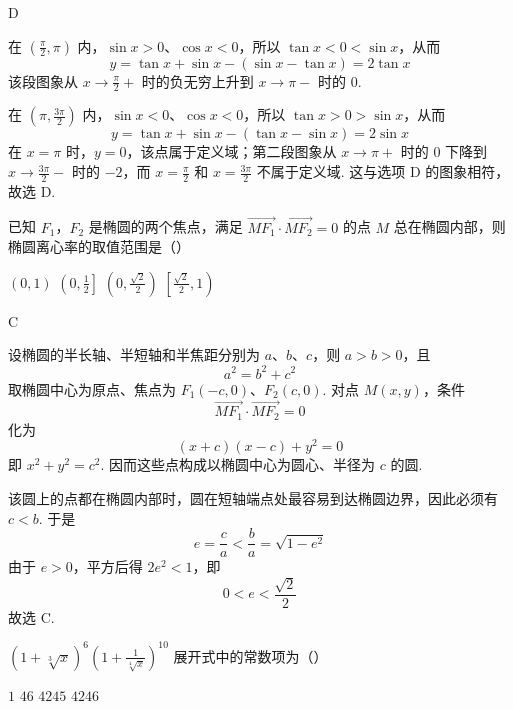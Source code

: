 \begin{answer}
D
\end{answer}

\begin{solution}
在 \(\left(\frac\pi2,\pi\right)\) 内，\(\sin x>0\)、\(\cos x<0\)，所以 \(\tan x<0<\sin x\)，从而
\[
y=\tan x+\sin x-(\sin x-\tan x)=2\tan x
\]
该段图象从 \(x\to\frac\pi2+\) 时的负无穷上升到 \(x\to\pi-\) 时的 \(0\).

在 \(\left(\pi,\frac{3\pi}{2}\right)\) 内，\(\sin x<0\)、\(\cos x<0\)，所以 \(\tan x>0>\sin x\)，从而
\[
y=\tan x+\sin x-(\tan x-\sin x)=2\sin x
\]
在 \(x=\pi\) 时，\(y=0\)，该点属于定义域；第二段图象从 \(x\to\pi+\) 时的 \(0\) 下降到 \(x\to\frac{3\pi}{2}-\) 时的 \(-2\)，而 \(x=\frac\pi2\) 和 \(x=\frac{3\pi}{2}\) 不属于定义域. 这与选项 D 的图象相符，故选 D.
\end{solution}

\begin{problem}
已知 \(F_{1}\)，\(F_{2}\) 是椭圆的两个焦点，满足 \(\overrightarrow{MF_{1}} \cdot \overrightarrow{MF_{2}} = 0\) 的点 \(M\) 总在椭圆内部，则椭圆离心率的取值范围是（\quad）

\choices
    {\((0,1)\)}
    {\(\left(0, \frac{1}{2}\right]\)}
    {\(\left(0, \frac{\sqrt{2}}{2}\right)\)}
    {\(\left[\frac{\sqrt{2}}{2}, 1\right)\)}
\end{problem}

\begin{answer}
C
\end{answer}

\begin{solution}
设椭圆的半长轴、半短轴和半焦距分别为 \(a\)、\(b\)、\(c\)，则 \(a>b>0\)，且
\[
a^2=b^2+c^2
\]
取椭圆中心为原点、焦点为 \(F_1(-c,0)\)、\(F_2(c,0)\). 对点 \(M(x,y)\)，条件
\[
\overrightarrow{MF_1}\cdot\overrightarrow{MF_2}=0
\]
化为
\[
(x+c)(x-c)+y^2=0
\]
即 \(x^2+y^2=c^2\). 因而这些点构成以椭圆中心为圆心、半径为 \(c\) 的圆.

该圆上的点都在椭圆内部时，圆在短轴端点处最容易到达椭圆边界，因此必须有 \(c<b\). 于是
\[
e=\frac ca<\frac ba=\sqrt{1-e^2}
\]
由于 \(e>0\)，平方后得 \(2e^2<1\)，即
\[
0<e<\frac{\sqrt2}{2}
\]
故选 C.
\end{solution}

\begin{problem}
\((1 + \sqrt[3]{x})^6\left(1 + \frac{1}{\sqrt[4]{x}}\right)^{10}\) 展开式中的常数项为（\quad）

\choices
    {\(1\)}
    {\(46\)}
    {\(4245\)}
    {\(4246\)}
\end{problem}

